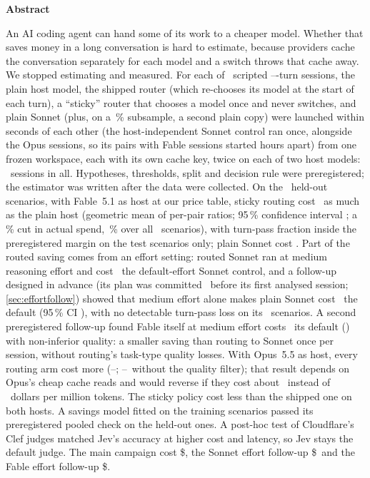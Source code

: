 \begin{center}\textbf{Abstract}\end{center}
\small
An AI coding agent can hand some of its work to a cheaper model. Whether that saves money in a long
conversation is hard to estimate, because providers cache the conversation separately for each model and
a switch throws that cache away. We stopped estimating and measured. For each of \NScenarios\ scripted
\MinTurns--\MaxTurns-turn sessions, the plain host model, the shipped router (which re-chooses its model at
the start of each turn), a ``sticky'' router that chooses a model once and never switches, and plain Sonnet
(plus, on a \AAPct\,\% subsample, a second plain copy) were launched within seconds of each other (the host-independent Sonnet control ran once, alongside the
Opus sessions, so its pairs with Fable sessions started hours apart) from one
frozen workspace, each with its own cache key, twice on each of two host models: \NSessions\ sessions in
all. Hypotheses, thresholds, split and decision rule were preregistered; the estimator was written after the
data were collected. On the \NTest\ held-out scenarios, with Fable~5.1 as host at our price table, sticky
routing cost \CfFableStickyPairTwo\X\ as much as the plain host (geometric mean of per-pair ratios; 95\,\%
confidence interval \CfFableStickyPairCITwo; a \RvSpendCutTest\,\% cut in actual spend, \RvSpendCutAll\,\% over all
\NScenarios\ scenarios), with turn-pass fraction inside the preregistered margin on the test scenarios only; plain
Sonnet cost \CfFableSonnetPairTwo\X. Part of the routed saving comes from an effort setting: routed Sonnet ran at
medium reasoning effort and cost \RvEffFableAll\X\ the default-effort Sonnet control, and a follow-up designed in advance (its plan was committed \EcFirstAfter\ before its first analysed session;
\cref{sec:effortfollow}) showed that medium effort alone makes plain Sonnet cost
\EcRatio\X\ the default (95\,\% CI \EcCI), with no detectable turn-pass loss on its \EcScen\ scenarios. A second
preregistered follow-up found Fable itself at medium effort costs \EfRatio\X\ its default (\EfCI) with non-inferior
quality: a smaller saving than routing to Sonnet once per session, without routing's task-type quality losses. With Opus~5.5 as host, every routing arm cost more
(\CfOpusStickyPairTwo\X--\CfOpusSonnetPairTwo\X; \CfOpusStickyArmTwo\X--\CfOpusSonnetArmTwo\X\ without the
quality filter); that result depends on Opus's cheap cache reads and would reverse if they cost about
\BEStickyPair\ instead of \PriceOpusRead\ dollars per million tokens. The sticky policy cost less than the
shipped one on both hosts. A savings model fitted on the training scenarios passed its preregistered pooled
check on the held-out ones. A post-hoc test of Cloudflare's Clef judges matched Jev's accuracy at higher cost and latency, so Jev stays the
default judge. The main campaign cost \$\SpendLedger, the Sonnet effort follow-up \$\EcSpend\ and the Fable effort follow-up \$\EfSpend.
\normalsize
